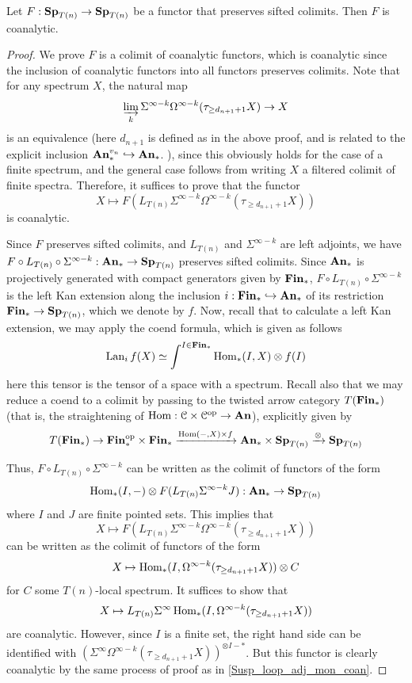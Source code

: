 	\begin{thm}
		Let $F:\mathbf{Sp}_{T(n)}\to\mathbf{Sp}_{T(n)}$ be a functor that preserves sifted colimits. Then $F$ is coanalytic. 
	\end{thm}
	\begin{proof}
		We prove $F$ is a colimit of coanalytic functors, which is coanalytic since the inclusion of coanalytic functors into all functors preserves colimits. Note that for any spectrum $X$, the natural map 
		\[ \varinjlim_k\Sigma^{\infty-k}\Omega^{\infty-k}(\tau_{\geq d_{n+1}+1}X)\to X \]
		is an equivalence (here $d_{n+1}$ is defined as in the above proof, and is related to the explicit inclusion $\mathbf{An}_*^{v_n}\hookrightarrow\mathbf{An}_*$. ), since this obviously holds for the case of a finite spectrum, and the general case follows from writing $X$ a filtered colimit of finite spectra. Therefore, it suffices to prove that the functor 
		\[ X\mapsto F(L_{T(n)}\Sigma^{\infty-k}\Omega^{\infty-k}(\tau_{\geq d_{n+1}+1}X)) \]
		is coanalytic. 

		Since $F$ preserves sifted colimits, and $L_{T(n)}$ and $\Sigma^{\infty-k}$ are left adjoints, we have $F\circ L_{T(n)}\circ\Sigma^{\infty-k}:\mathbf{An}_*\to\mathbf{Sp}_{T(n)}$ preserves sifted colimits. Since $\mathbf{An}_*$ is projectively generated with compact generators given by $\mathbf{Fin}_*$, $F\circ L_{T(n)}\circ\Sigma^{\infty-k}$ is the left Kan extension along the inclusion $i:\mathbf{Fin}_*\hookrightarrow\mathbf{An}_*$ of its restriction $\mathbf{Fin}_*\to\mathbf{Sp}_{T(n)}$, which we denote by $f$. Now, recall that to calculate a left Kan extension, we may apply the coend formula, which is given as follows 
		\[ \operatorname{\mathrm{Lan}}_if(X)\simeq\int^{I\in\mathbf{Fin}_*}\operatorname{\mathrm{Hom}}_*(I,X)\otimes f(I) \]
		here this tensor is the tensor of a space with a spectrum. Recall also that we may reduce a coend to a colimit by passing to the twisted arrow category $T(\mathbf{Fin}_*)$ (that is, the straightening of $\operatorname{\mathrm{Hom}}:\mathcal{C}\times\mathcal{C}^{\operatorname{\mathrm{op}}}\to\mathbf{An}$), explicitly given by 
		\[ T(\mathbf{Fin}_*)\to\mathbf{Fin}_*^{\operatorname{\mathrm{op}}}\times\mathbf{Fin}_*\xrightarrow{\operatorname{\mathrm{Hom}}(-,X)\times f}\mathbf{An}_*\times\mathbf{Sp}_{T(n)}\xrightarrow{\otimes}\mathbf{Sp}_{T(n)} \]

		Thus, $F\circ L_{T(n)}\circ\Sigma^{\infty-k}$ can be written as the colimit of functors of the form 
		\[ \operatorname{\mathrm{Hom}}_*(I,-)\otimes F(L_{T(n)}\Sigma^{\infty-k}J):\mathbf{An}_*\to\mathbf{Sp}_{T(n)} \]
		where $I$ and $J$ are finite pointed sets. This implies that 
		\[ X\mapsto F(L_{T(n)}\Sigma^{\infty-k}\Omega^{\infty-k}(\tau_{\geq d_{n+1}+1}X)) \]
		can be written as the colimit of functors of the form 
		\[ X\mapsto\operatorname{\mathrm{Hom}}_*(I,\Omega^{\infty-k}(\tau_{\geq d_{n+1}+1}X))\otimes C \]
		for $C$ some $T(n)$-local spectrum. It suffices to show that 
		\[ X\mapsto L_{T(n)}\Sigma^\infty\operatorname{\mathrm{Hom}}_*(I,\Omega^{\infty-k}(\tau_{\geq d_{n+1}+1}X)) \]
		are coanalytic. However, since $I$ is a finite set, the right hand side can be identified with $(\Sigma^\infty\Omega^{\infty-k}(\tau_{\geq d_{n+1}+1}X))^{\otimes I-*}$. But this functor is clearly coanalytic by the same process of proof as in \cref{Susp_loop_adj_mon_coan}. 
	\end{proof}

